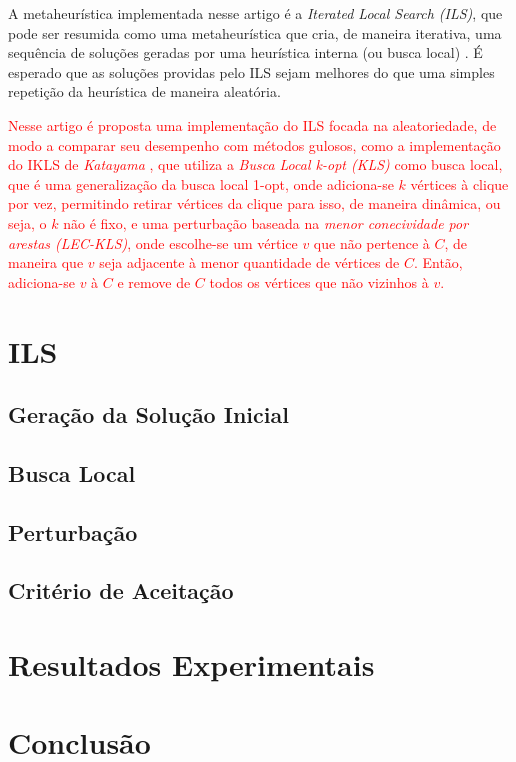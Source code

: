 \documentclass{article}
\begin{document}
A metaheurística implementada nesse artigo é a \textit{Iterated Local Search (ILS)}, que pode ser resumida como uma metaheurística que cria, de maneira iterativa, uma sequência de soluções geradas por uma heurística interna (ou busca local) \cite{handbook}. É esperado que as soluções providas pelo ILS sejam melhores do que uma simples repetição da heurística de maneira aleatória.

\textcolor{red}{Nesse artigo é proposta uma implementação do ILS focada na aleatoriedade, de modo a comparar seu desempenho com métodos gulosos, como a implementação do IKLS de \textit{Katayama} \cite{kopt}, que utiliza a \textit{Busca Local k-opt (KLS)} \cite{KLS} como busca local, que é uma generalização da busca local 1-opt, onde adiciona-se $k$ vértices à clique por vez, permitindo retirar vértices da clique para isso, de maneira dinâmica, ou seja, o $k$ não é fixo,  e uma perturbação baseada na \textit{menor conecividade por arestas (LEC-KLS)}, onde escolhe-se um vértice $v$ que não pertence à $C$, de maneira que $v$ seja adjacente à menor quantidade de vértices de $C$. Então, adiciona-se $v$  à $C$ e remove de $C$ todos os vértices que não vizinhos à $v$.}\par


\section{ILS}
\subsection{Geração da Solução Inicial}
\subsection{Busca Local}
\subsection{Perturbação}
\subsection{Critério de Aceitação}
\section{Resultados Experimentais}
\section{Conclusão}
\end{document}
